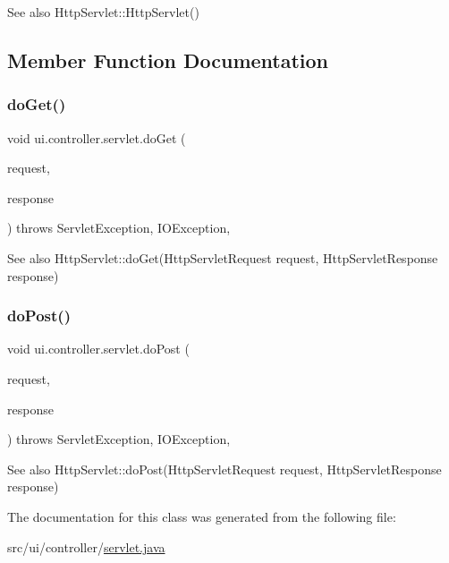 \begin{DoxySeeAlso}{See also}
Http\+Servlet\+::\+Http\+Servlet() 
\end{DoxySeeAlso}


\subsection{Member Function Documentation}
\mbox{\label{classui_1_1controller_1_1servlet_a547878c9dee95f1b799d074ac6316f4b}} 
\subsubsection{\texorpdfstring{do\+Get()}{doGet()}}
{\footnotesize\ttfamily void ui.\+controller.\+servlet.\+do\+Get (\begin{DoxyParamCaption}\item[{Http\+Servlet\+Request}]{request,  }\item[{Http\+Servlet\+Response}]{response }\end{DoxyParamCaption}) throws Servlet\+Exception, I\+O\+Exception\hspace{0.3cm}{\ttfamily [inline]}, {\ttfamily [protected]}}

\begin{DoxySeeAlso}{See also}
Http\+Servlet\+::do\+Get(Http\+Servlet\+Request request, Http\+Servlet\+Response response) 
\end{DoxySeeAlso}
\mbox{\label{classui_1_1controller_1_1servlet_a02867e7637116d244a8233f99c40038a}} 
\subsubsection{\texorpdfstring{do\+Post()}{doPost()}}
{\footnotesize\ttfamily void ui.\+controller.\+servlet.\+do\+Post (\begin{DoxyParamCaption}\item[{Http\+Servlet\+Request}]{request,  }\item[{Http\+Servlet\+Response}]{response }\end{DoxyParamCaption}) throws Servlet\+Exception, I\+O\+Exception\hspace{0.3cm}{\ttfamily [inline]}, {\ttfamily [protected]}}

\begin{DoxySeeAlso}{See also}
Http\+Servlet\+::do\+Post(Http\+Servlet\+Request request, Http\+Servlet\+Response response) 
\end{DoxySeeAlso}


The documentation for this class was generated from the following file\+:\begin{DoxyCompactItemize}
\item 
src/ui/controller/\mbox{\hyperlink{servlet_8java}{servlet.\+java}}\end{DoxyCompactItemize}
